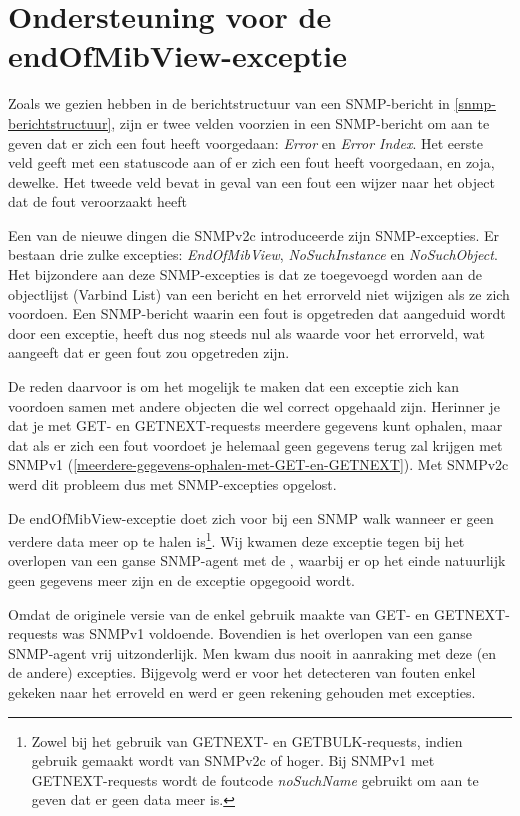 \section{Ondersteuning voor de endOfMibView-exceptie}
\label{probleem-endofmibview-exceptie}

Zoals we gezien hebben in de berichtstructuur van een SNMP-bericht in \cref{snmp-berichtstructuur},
zijn er twee velden voorzien in een SNMP-bericht om aan te geven dat er zich een fout heeft voorgedaan: \textit{Error} en \textit{Error Index}.
Het eerste veld geeft met een statuscode aan of er zich een fout heeft voorgedaan, en zoja, dewelke.
Het tweede veld bevat in geval van een fout een wijzer naar het object dat de fout veroorzaakt heeft

Een van de nieuwe dingen die SNMPv2c introduceerde zijn SNMP-excepties.
Er bestaan drie zulke excepties: \textit{EndOfMibView}, \textit{NoSuchInstance} en \textit{NoSuchObject}.
Het bijzondere aan deze SNMP-excepties is dat ze toegevoegd worden aan de objectlijst (Varbind List) van een bericht
en het errorveld niet wijzigen als ze zich voordoen\cite{endOfMibView-error-status}.
Een SNMP-bericht waarin een fout is opgetreden dat aangeduid wordt door een exceptie, heeft dus nog steeds nul als waarde voor het errorveld,
wat aangeeft dat er geen fout zou opgetreden zijn.

De reden daarvoor is om het mogelijk te maken dat een exceptie zich kan voordoen samen met andere objecten die wel correct opgehaald zijn.
Herinner je dat je met GET- en GETNEXT-requests meerdere gegevens kunt ophalen,
maar dat als er zich een fout voordoet je helemaal geen gegevens terug zal krijgen met SNMPv1 (\cref{meerdere-gegevens-ophalen-met-GET-en-GETNEXT}).
Met SNMPv2c werd dit probleem dus met SNMP-excepties opgelost.

De endOfMibView-exceptie doet zich voor bij een SNMP walk wanneer er geen verdere data meer op te halen is\footnote{
	Zowel bij het gebruik van GETNEXT- en GETBULK-requests, indien gebruik gemaakt wordt van SNMPv2c of hoger.
	Bij SNMPv1 met GETNEXT-requests wordt de foutcode \textit{noSuchName} gebruikt om aan te geven dat er geen data meer is\cite{snmp-exceptions-v2c-to-v1}.
}\cite{snmp-exceptions-explained}.
Wij kwamen deze exceptie tegen bij het overlopen van een ganse SNMP-agent met de \nwmretriever{},
waarbij er op het einde natuurlijk geen gegevens meer zijn en de exceptie opgegooid wordt.

Omdat de originele versie van de \nwmretriever{} enkel gebruik maakte van GET- en GETNEXT-requests was SNMPv1 voldoende.
Bovendien is het overlopen van een ganse SNMP-agent vrij uitzonderlijk. Men kwam dus nooit in aanraking met deze (en de andere) excepties.
Bijgevolg werd er voor het detecteren van fouten enkel gekeken naar het erroveld en werd er geen rekening gehouden met excepties.

